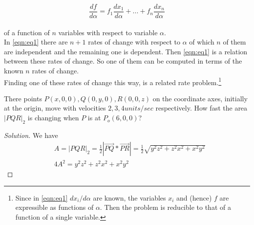 \documentclass[11pt]{amsbook}
\begin{document}
\begin{equation}
  \label{eqn:eq1}
  \frac{df}{d\alpha} = f_1\frac{dx_1}{d\alpha} + ... + f_n\frac{dx_n}{d\alpha}
  \tag{1}
\end{equation}
\\ of a function of $n$ variables with respect to variable $\alpha$.\\

\indent In \eqref{eqn:eq1} there are $n+1$ rates of change with respect to $\alpha$ of which $n$ of them are independent and the remaining one is dependent. Then \eqref{eqn:eq1} is a relation between these rates of change. So one of them can be computed in terms of the known $n$ rates of change.\\

\indent Finding one of these rates of change this way, is a related rate problem.\footnote{Since in \eqref{eqn:eq1} $dx_i/d\alpha$ are known, the variables $x_i$ and (hence) $f$ are expressible as functions of $\alpha$. Then the problem is reducible to that of a function of a single variable.}

\begin{exmp}
There points $P(x,0,0), Q(0,y,0), R(0,0,z)$ on the coordinate axes, initially at the origin, move with velocities $2, 3, 4 units/sec$ respectively. How fast the area $|PQR|_2$ is changing when $P$ is at $P_o(6,0,0)$?
\end{exmp}

\begin{proof}[Solution] We have
\[
  \begin{aligned}
    & A = |PQR|_2 = \frac{1}{2} |\overrightarrow{PQ} * \overrightarrow{PR}| = \frac{1}{2} \sqrt{y^2z^2 + z^2x^2 + x^2y^2} \\
    & 4A^2 = y^2z^2 + z^2x^2 + x^2y^2
  \end{aligned}
\]
\end{proof}
\end{document}
